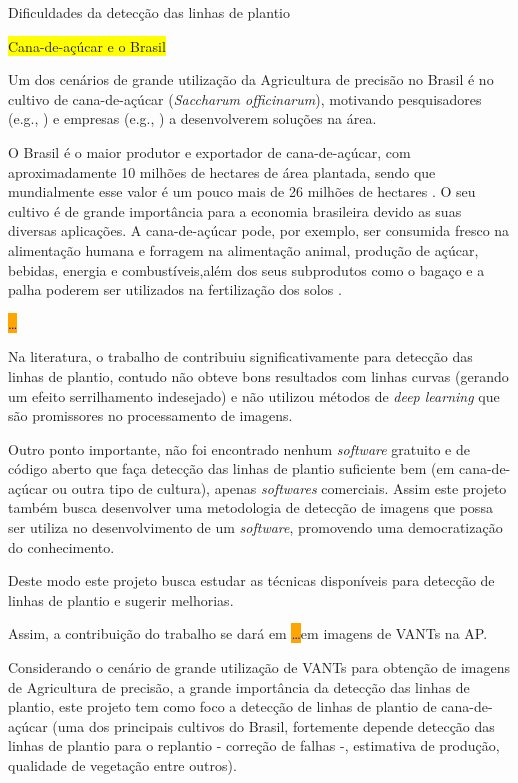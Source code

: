 \documentclass[12pt, a4paper, english, brazil]{article}
\newcommand{\textRed}[1]{{{\color{red} #1}}}
\newcommand{\dotsBlue}{\colorbox{orange}{\textcolor{blue}{\dots}}}
\newcommand{\boxYellow}[1]{\colorbox{yellow}{#1}}
\begin{document}
\textRed{Dificuldades da detecção das linhas de plantio}

\boxYellow{Cana-de-açúcar e o Brasil}

Um dos cenários de grande utilização da Agricultura de precisão no Brasil é no cultivo de cana-de-açúcar (\textit{Saccharum officinarum}), motivando pesquisadores (e.g., ) e empresas (e.g., ) a desenvolverem soluções na área.

O Brasil é o maior produtor e exportador de cana-de-açúcar, com aproximadamente 10 milhões de hectares de área plantada, sendo que mundialmente esse valor é um pouco mais de 26 milhões de hectares \cite{Ritchie_2020, IBGE_2021, FAOSTAT_2021}. O seu cultivo é de grande importância para a economia brasileira devido as suas diversas aplicações. A cana-de-açúcar pode, por exemplo, ser consumida fresco na alimentação humana e forragem na alimentação animal, produção de açúcar, bebidas, energia e combustíveis,além dos seus subprodutos como o bagaço e a palha poderem ser utilizados na fertilização dos solos \cite{Oliveira_2018}.

\dotsBlue

Na literatura, o trabalho de  contribuiu significativamente para detecção das linhas de plantio, contudo não obteve bons resultados com linhas curvas (gerando um efeito serrilhamento indesejado) \textRed{e não utilizou métodos de \textit{deep learning} que são promissores no processamento de imagens}. 

Outro ponto importante, não foi encontrado nenhum \textit{software} gratuito e de código aberto que faça detecção das linhas de plantio suficiente bem (em cana-de-açúcar ou outra tipo de cultura), apenas \textit{softwares} comerciais. Assim este projeto também busca desenvolver uma metodologia de detecção de imagens que possa ser utiliza no desenvolvimento de um \textit{software}, promovendo uma democratização do conhecimento.


Deste modo este projeto busca estudar as técnicas disponíveis para detecção de linhas de plantio e sugerir melhorias.


Assim, a contribuição do trabalho se dará em
\dotsBlue em imagens de VANTs na AP.


Considerando o cenário de grande utilização de VANTs para obtenção de imagens de Agricultura de precisão, a grande importância da detecção das linhas de plantio, este projeto tem como foco a detecção de linhas de plantio de cana-de-açúcar (uma dos principais cultivos do Brasil, fortemente depende detecção das linhas de plantio para o replantio - correção de falhas -, estimativa de produção, qualidade de vegetação entre outros).
\end{document}
